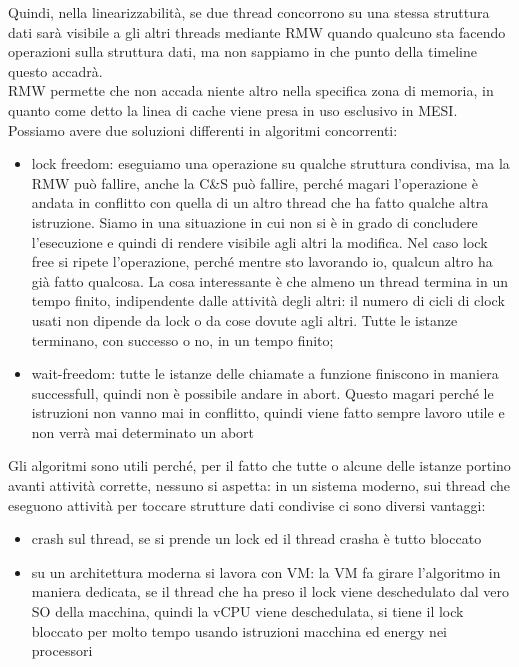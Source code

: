 \documentclass[12pt, oneside]{extbook}
\begin{document}
Quindi, nella linearizzabilità, se due thread concorrono su una stessa struttura dati sarà visibile a gli altri threads mediante RMW quando qualcuno sta facendo operazioni sulla struttura dati, ma non sappiamo in che punto della timeline questo accadrà.\\ RMW permette che non accada niente altro nella specifica zona di memoria, in quanto come detto la linea di cache viene presa in uso esclusivo in MESI. \\ Possiamo avere due soluzioni differenti in algoritmi concorrenti:
\begin{itemize}
\item lock freedom: eseguiamo una operazione su qualche struttura condivisa, ma la RMW può fallire, anche la C\&S può fallire, perché magari l'operazione è andata in conflitto con quella di un altro thread che ha fatto qualche altra istruzione. Siamo in una situazione in cui non si è in grado di concludere l'esecuzione e quindi di rendere visibile agli altri la modifica. Nel caso lock free si ripete l'operazione, perché mentre sto lavorando io, qualcun altro ha già fatto qualcosa. La cosa interessante è che almeno un thread termina in un tempo finito, indipendente dalle attività degli altri: il numero di cicli di clock usati non dipende da lock o da cose dovute agli altri. Tutte le istanze terminano, con successo o no, in un tempo finito;
\item wait-freedom: tutte le istanze delle chiamate a funzione finiscono in maniera successfull, quindi non è possibile andare in abort. Questo magari perché le istruzioni non vanno mai in conflitto, quindi viene fatto sempre lavoro utile e non verrà mai determinato un abort
\end{itemize}
Gli algoritmi sono utili perché, per il fatto che tutte o alcune delle istanze portino avanti attività corrette, nessuno si aspetta: in un sistema moderno, sui thread che eseguono attività per toccare strutture dati condivise ci sono diversi vantaggi:
\begin{itemize}
\item crash sul thread, se si prende un lock ed il thread crasha è tutto bloccato
\item su un architettura moderna si lavora con VM: la VM fa girare l'algoritmo in maniera dedicata, se il thread che ha preso il lock viene deschedulato dal vero SO della macchina, quindi la vCPU viene deschedulata, si tiene il lock bloccato per molto tempo usando istruzioni macchina ed energy nei processori
\end{itemize}
\end{document}
